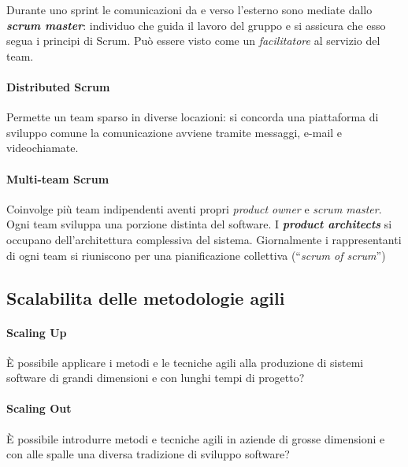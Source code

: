 Durante uno sprint le comunicazioni da e verso l'esterno sono mediate dallo \textbf{\textit{scrum master}}: individuo che guida il lavoro del gruppo e si assicura che esso segua i principi di Scrum. Può essere visto come un \textit{facilitatore} al servizio del team.

\paragraph{Distributed Scrum} Permette un team sparso in diverse locazioni: si concorda una piattaforma di sviluppo comune la comunicazione avviene tramite messaggi, e-mail e videochiamate.

\paragraph{Multi-team Scrum} Coinvolge più team indipendenti aventi propri \textit{product owner} e \textit{scrum master}. Ogni team sviluppa una porzione distinta del software. I \textbf{\textit{product architects}} si occupano dell'architettura complessiva del sistema. Giornalmente i rappresentanti di ogni team si riuniscono per una pianificazione collettiva (“\textit{scrum of scrum}”)

\subsection{Scalabilita delle metodologie agili}

\paragraph{Scaling Up} È possibile applicare i metodi e le tecniche agili alla produzione di sistemi software di grandi dimensioni e con lunghi tempi di progetto?

\paragraph{Scaling Out} È possibile introdurre metodi e tecniche agili in aziende di grosse dimensioni e con alle spalle una diversa tradizione di sviluppo software?

